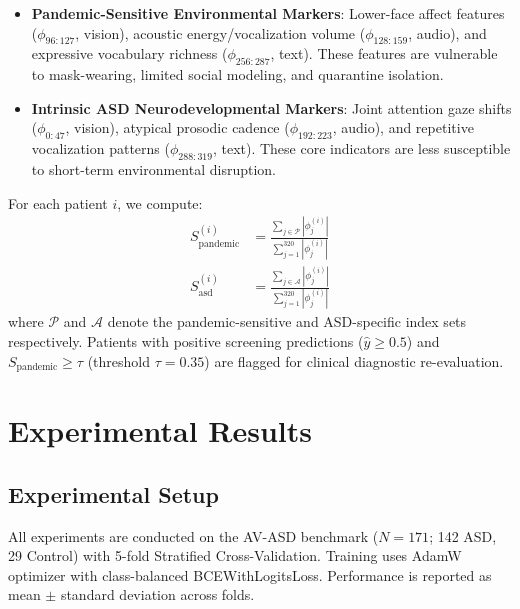 \documentclass[conference]{IEEEtran}
\begin{document}
\begin{itemize}
    \item \textbf{Pandemic-Sensitive Environmental Markers}: Lower-face affect features ($\phi_{96:127}$, vision), acoustic energy/vocalization volume ($\phi_{128:159}$, audio), and expressive vocabulary richness ($\phi_{256:287}$, text). These features are vulnerable to mask-wearing, limited social modeling, and quarantine isolation.

    \item \textbf{Intrinsic ASD Neurodevelopmental Markers}: Joint attention gaze shifts ($\phi_{0:47}$, vision), atypical prosodic cadence ($\phi_{192:223}$, audio), and repetitive vocalization patterns ($\phi_{288:319}$, text). These core indicators are less susceptible to short-term environmental disruption.
\end{itemize}

For each patient $i$, we compute:
\begin{align}
    S_{\text{pandemic}}^{(i)} &= \frac{\sum_{j \in \mathcal{P}} |\phi_j^{(i)}|}{\sum_{j=1}^{320} |\phi_j^{(i)}|} \\
    S_{\text{asd}}^{(i)} &= \frac{\sum_{j \in \mathcal{A}} |\phi_j^{(i)}|}{\sum_{j=1}^{320} |\phi_j^{(i)}|}
\end{align}
where $\mathcal{P}$ and $\mathcal{A}$ denote the pandemic-sensitive and ASD-specific index sets respectively. Patients with positive screening predictions ($\hat{y} \geq 0.5$) and $S_{\text{pandemic}} \geq \tau$ (threshold $\tau = 0.35$) are flagged for clinical diagnostic re-evaluation.

\section{Experimental Results}
\label{sec:results}

\subsection{Experimental Setup}

All experiments are conducted on the AV-ASD benchmark ($N=171$; 142 ASD, 29 Control) with 5-fold Stratified Cross-Validation. Training uses AdamW optimizer with class-balanced BCEWithLogitsLoss. Performance is reported as mean $\pm$ standard deviation across folds.
\end{document}
